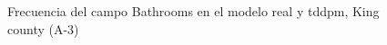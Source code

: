 \begin{figure}[H]
    \centering
    
    \caption{Frecuencia del campo Bathrooms en el modelo real y tddpm, King county (A-3)}
    \label{frecuency-tddpm-bathrooms}
\end{figure}